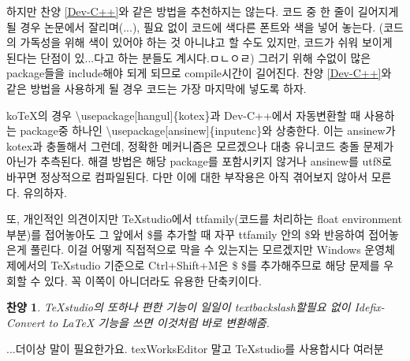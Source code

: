 \documentclass[11pt]{article}
\newtheorem{praise}{찬양}
\begin{document}
하지만 찬양 \ref{Dev-C++}와 같은 방법을 추천하지는 않는다. 코드 중 한 줄이 길어지게 될 경우 논문에서 잘리며(...), 필요 없이 코드에 색다른 폰트와 색을 넣어 놓는다. (코드의 가독성을 위해 색이 있어야 하는 것 아니냐고 할 수도 있지만, 코드가 쉬워 보이게 된다는 단점이 있...다고 하는 분들도 계시다.ㅁㄴㅇㄹ) 그러기 위해 수없이 많은 package들을 include해야 되게 되므로 compile시간이 길어진다. 찬양 \ref{Dev-C++}와 같은 방법을 사용하게 될 경우 코드는 가장 마지막에 넣도록 하자.

koTeX의 경우 \textbackslash usepackage[hangul]\{kotex\}과 Dev-C++에서 자동변환할 때 사용하는 package중 하나인 \textbackslash usepackage[ansinew]\{inputenc\}와 상충한다. 이는 ansinew가 kotex과 충돌해서 그런데, 정확한 메커니즘은 모르겠으나 대충 유니코드 충돌 문제가 아닌가 추측된다. 해결 방법은 해당 package를 포함시키지 않거나 ansinew를 utf8로 바꾸면 정상적으로 컴파일된다. 다만 이에 대한 부작용은 아직 겪어보지 않아서 모른다. 유의하자.

또, 개인적인 의견이지만 TeXstudio에서 ttfamily(코드를 처리하는 float environment 부분)를 접어놓아도 그 앞에서 \$를 추가할 때 자꾸 ttfamily 안의 \$와 반응하여 접어놓은게 풀린다. 이걸 어떻게 직접적으로 막을 수 있는지는 모르겠지만 Windows 운영체제에서의 TeXstudio 기준으로 Ctrl+Shift+M은 \$ \$를 추가해주므로 해당 문제를 우회할 수 있다. 꼭 이쪽이 아니더라도 유용한 단축키이다.

\begin{praise}
	TeXstudio의 또하나 편한 기능이 일일이 textbackslash할필요 없이 Idefix-Convert to LaTeX 기능을 쓰면 이것처럼 바로 변환해줌.
\end{praise}
...더이상 말이 필요한가요. texWorksEditor 말고 TeXstudio를 사용합시다 여러분




\end{document}
